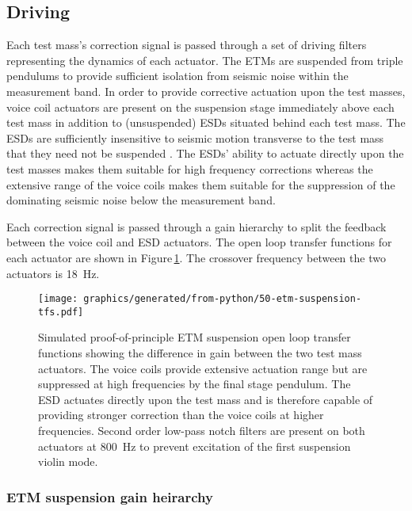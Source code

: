 \subsection{Driving}

Each test mass's correction signal is passed through a set of driving filters representing the dynamics of each actuator. The ETMs are suspended from triple pendulums to provide sufficient isolation from seismic noise within the measurement band. In order to provide corrective actuation upon the test masses, voice coil actuators are present on the suspension stage immediately above each test mass in addition to (unsuspended) ESDs situated behind each test mass. The ESDs are sufficiently insensitive to seismic motion transverse to the test mass that they need not be suspended \cite{Wittel2015}. The ESDs' ability to actuate directly upon the test masses makes them suitable for high frequency corrections whereas the extensive range of the voice coils makes them suitable for the suppression of the dominating seismic noise below the measurement band.

Each correction signal is passed through a gain hierarchy to split the feedback between the voice coil and ESD actuators. The open loop transfer functions for each actuator are shown in Figure\,\ref{fig:suspension-crossover}. The crossover frequency between the two actuators is \SI{18}{\hertz}.

\begin{figure}
  \texttt{[image: graphics/generated/from-python/50-etm-suspension-tfs.pdf]}
  \caption[Simulated end test mass suspension open loop transfer functions]{\label{fig:suspension-crossover}Simulated proof-of-principle \SSM{} \gls{ETM} suspension open loop transfer functions showing the difference in gain between the two test mass actuators. The voice coils provide extensive actuation range but are suppressed at high frequencies by the final stage pendulum. The \gls{ESD} actuates directly upon the test mass and is therefore capable of providing stronger correction than the voice coils at higher frequencies. Second order low-pass notch filters are present on both actuators at \SI{800}{\hertz} to prevent excitation of the first suspension violin mode.}
\end{figure}

\subsubsection{ETM suspension gain heirarchy}

